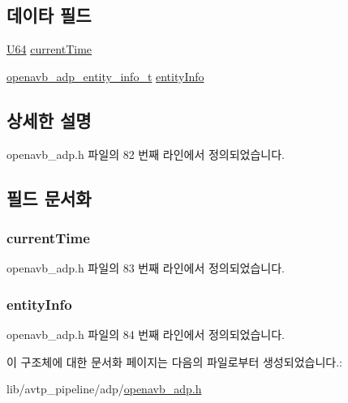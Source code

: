\subsection*{데이타 필드}
\begin{DoxyCompactItemize}
\item 
\hyperlink{openavb__types__base__pub_8h_a25809e0734a149248fcf5831efa4e33d}{U64} \hyperlink{structopenavb__adp__sm__global__vars__t_a72063720a923e62dadad8516a56c183f}{current\+Time}
\item 
\hyperlink{structopenavb__adp__entity__info__t}{openavb\+\_\+adp\+\_\+entity\+\_\+info\+\_\+t} \hyperlink{structopenavb__adp__sm__global__vars__t_a0a53d1ffa923d38bed8b74cbf8629070}{entity\+Info}
\end{DoxyCompactItemize}


\subsection{상세한 설명}


openavb\+\_\+adp.\+h 파일의 82 번째 라인에서 정의되었습니다.



\subsection{필드 문서화}
\subsubsection[{\texorpdfstring{current\+Time}{currentTime}}]{ current\+Time}\hypertarget{structopenavb__adp__sm__global__vars__t_a72063720a923e62dadad8516a56c183f}{}\label{structopenavb__adp__sm__global__vars__t_a72063720a923e62dadad8516a56c183f}


openavb\+\_\+adp.\+h 파일의 83 번째 라인에서 정의되었습니다.

\subsubsection[{\texorpdfstring{entity\+Info}{entityInfo}}]{ entity\+Info}\hypertarget{structopenavb__adp__sm__global__vars__t_a0a53d1ffa923d38bed8b74cbf8629070}{}\label{structopenavb__adp__sm__global__vars__t_a0a53d1ffa923d38bed8b74cbf8629070}


openavb\+\_\+adp.\+h 파일의 84 번째 라인에서 정의되었습니다.



이 구조체에 대한 문서화 페이지는 다음의 파일로부터 생성되었습니다.\+:\begin{DoxyCompactItemize}
\item 
lib/avtp\+\_\+pipeline/adp/\hyperlink{openavb__adp_8h}{openavb\+\_\+adp.\+h}\end{DoxyCompactItemize}
